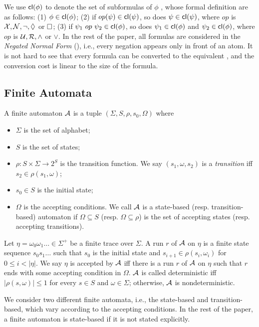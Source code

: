 We use ${\sf cl}(\phi)$ to denote the set of subformulas of $\phi$ \cite{Wol81}, whose formal definition are as follows: (1) $\phi\in{\sf cl}(\phi)$; (2) if $op (\psi)\in{\sf cl}(\psi)$, so does $\psi\in{\sf cl}(\psi)$, where $op$ is $\mathcal{X},\mathcal{N},\neg,\Diamond$ or $\Box$; (3) if $\psi_1\ op\ \psi_2\in{\sf cl}(\phi)$, so does $\psi_1\in{\sf cl}(\phi)$ and $\psi_2\in{\sf cl}(\phi)$, where $op$ is $\mathcal{U},\mathcal{R},\wedge$ or $\vee$. In the rest of the paper, all \ltlf formulas are considered in the \emph{Negated Normal Form} (\NNF), i.e., every negation appears only in front of an atom. It is not hard to see that every \ltlf formula can be converted to the equivalent \NNF, and the conversion cost is linear to the size of the formula.

\subsection{Finite Automata}
\noindent A finite automaton $\mathcal{A}$ is a tuple $(\Sigma, S, \rho, s_0, \Omega)$ where 
\begin{itemize}
	\item $\Sigma$ is the set of alphabet;
	\item $S$ is the set of states;
	\item $\rho: S\times\Sigma \rightarrow 2^S$ is the transition function. We say $(s_1,\omega, s_2)$ is a \emph{transition} iff $s_2\in\rho(s_1,\omega)$;
	\item $s_0\in S$ is the initial state;
	\item $\Omega$ is the accepting conditions. We call $\mathcal{A}$ is a state-based (resp. transition-based) automaton if $\Omega\subseteq S$ (resp. $\Omega\subseteq \rho$) is the set of accepting states (resp. accepting transitions).
\end{itemize}
Let $\eta=\omega_0\omega_1\ldots\in\Sigma^+$ be a finite trace over $\Sigma$. A run $r$ of $\mathcal{A}$ on $\eta$ is a finite state sequence $s_0 s_1\ldots$ such that $s_0$ is the initial state and $s_{i+1}\in\rho(s_i,\omega_i)$ for $0\leq i < |\eta|$. We say $\eta$ is accepted by $\mathcal{A}$ iff there is a run $r$ of $\mathcal{A}$ on $\eta$ such that $r$ ends with some accepting condition in $\Omega$. $\mathcal{A}$ is called deterministic iff $|\rho(s,\omega)| \leq 1$ for every $s\in S$ and $\omega\in\Sigma$; otherwise, $\mathcal{A}$ is nondeterministic. 

We consider two different finite automata, i.e., the state-based and transition-based, which vary according to the accepting conditions. In the rest of the paper, a finite automaton is state-based if it is not stated explicitly.  

